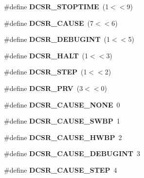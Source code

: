 \begin{DoxyCompactItemize}
\mbox{\label{riscv-utility_8h_a8e011fbc15f29c25a9197e306eefc4bc}} 
\#define {\bfseries D\+C\+S\+R\+\_\+\+S\+T\+O\+P\+T\+I\+ME}~(1$<$$<$9)
\item 
\mbox{\label{riscv-utility_8h_a81c7d48193a62ce9c189bb0d2d104230}} 
\#define {\bfseries D\+C\+S\+R\+\_\+\+C\+A\+U\+SE}~(7$<$$<$6)
\item 
\mbox{\label{riscv-utility_8h_abf604fa800bf4ef6aa8e58e662c34317}} 
\#define {\bfseries D\+C\+S\+R\+\_\+\+D\+E\+B\+U\+G\+I\+NT}~(1$<$$<$5)
\item 
\mbox{\label{riscv-utility_8h_a1a6de95ef85a1337a6c9bbfb8588d137}} 
\#define {\bfseries D\+C\+S\+R\+\_\+\+H\+A\+LT}~(1$<$$<$3)
\item 
\mbox{\label{riscv-utility_8h_a5136c4da715d2aa79f23dab172db4fea}} 
\#define {\bfseries D\+C\+S\+R\+\_\+\+S\+T\+EP}~(1$<$$<$2)
\item 
\mbox{\label{riscv-utility_8h_a110f30f7c9d25c057e2dfe1477e5b742}} 
\#define {\bfseries D\+C\+S\+R\+\_\+\+P\+RV}~(3$<$$<$0)
\item 
\mbox{\label{riscv-utility_8h_a4cf6a474d1cc251a206f9ab512794581}} 
\#define {\bfseries D\+C\+S\+R\+\_\+\+C\+A\+U\+S\+E\+\_\+\+N\+O\+NE}~0
\item 
\mbox{\label{riscv-utility_8h_a0ca8d97eb41a31351ea471e87a6cb383}} 
\#define {\bfseries D\+C\+S\+R\+\_\+\+C\+A\+U\+S\+E\+\_\+\+S\+W\+BP}~1
\item 
\mbox{\label{riscv-utility_8h_a73fbd946de0ee961a37aef9cf0113c10}} 
\#define {\bfseries D\+C\+S\+R\+\_\+\+C\+A\+U\+S\+E\+\_\+\+H\+W\+BP}~2
\item 
\mbox{\label{riscv-utility_8h_a28fc94b1080dd0151ad942fd38ecf04d}} 
\#define {\bfseries D\+C\+S\+R\+\_\+\+C\+A\+U\+S\+E\+\_\+\+D\+E\+B\+U\+G\+I\+NT}~3
\item 
\mbox{\label{riscv-utility_8h_a47955acab2f0d71bde8d2dbacebc1ce1}} 
\#define {\bfseries D\+C\+S\+R\+\_\+\+C\+A\+U\+S\+E\+\_\+\+S\+T\+EP}~4

\end{DoxyCompactItemize}
